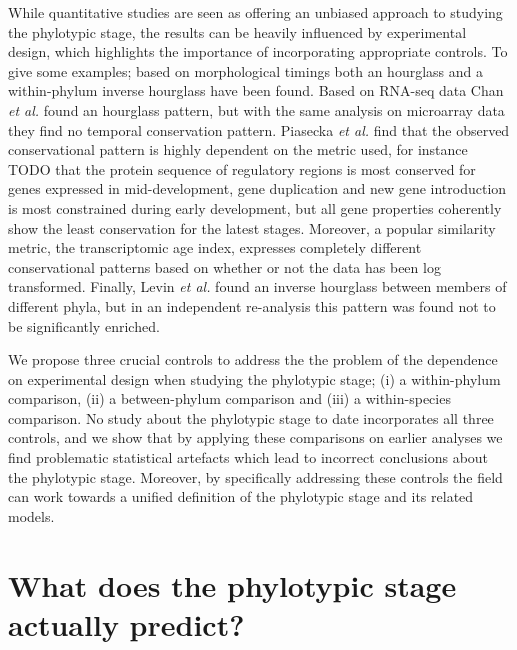 While quantitative studies are seen as offering an unbiased approach to studying the phylotypic stage, the results can be heavily influenced by experimental design, which highlights the importance of incorporating appropriate controls. To give some examples; based on morphological timings both an hourglass\cite{Cordero2020} and a within-phylum inverse hourglass\cite{OlafRP2003} have been found. Based on RNA-seq data Chan \textit{et al.} found an hourglass pattern, but with the same analysis on microarray data they find no temporal conservation pattern\cite{Chan2021}. Piasecka \textit{et al.} find that the observed conservational pattern is highly dependent on the metric used, for instance TODO that the protein sequence of regulatory regions is most conserved for genes expressed in mid-development, gene duplication and new gene introduction is most constrained during early development, but all gene properties coherently show the least conservation for the latest stages\cite{Piasecka2013}. Moreover, a popular similarity metric, the transcriptomic age index\cite{DomazetLoso2010}, expresses completely different conservational patterns based on whether or not the data has been log transformed\cite{Piasecka2013}. Finally, Levin \textit{et al.} found an inverse hourglass between members of different phyla\cite{Levin2016}, but in an independent re-analysis this pattern was found not to be significantly enriched\cite{Dunn2018}. 

We propose three crucial controls to address the the problem of the dependence on experimental design when studying the phylotypic stage; (i) a within-phylum comparison, (ii) a between-phylum comparison and (iii) a within-species comparison. No study about the phylotypic stage to date incorporates all three controls, and we show that by applying these comparisons on earlier analyses we find problematic statistical artefacts which lead to incorrect conclusions about the phylotypic stage. Moreover, by specifically addressing these controls the field can work towards a unified definition of the phylotypic stage and its related models.

\section{What does the phylotypic stage actually predict?}

